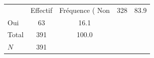 {
\def\sym#1{\ifmmode^{#1}\else\(^{#1}\)\fi}
\begin{tabular}{l*{1}{cc}}
\toprule
            &    Effectif&Fréquence (%
\midrule
Non         &         328&        83.9\\
Oui         &          63&        16.1\\
Total       &         391&       100.0\\
\midrule
\(N\)       &         391&            \\
\bottomrule
\end{tabular}
}

